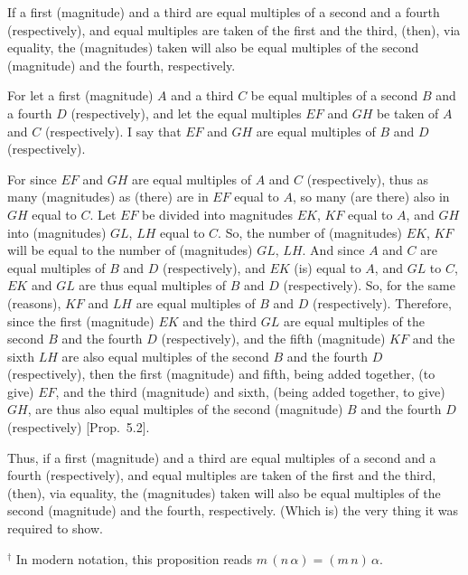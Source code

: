\begin{Parallel}{}{}
{If a first (magnitude) and a third are equal multiples
of a second and a fourth (respectively), and equal multiples are taken of the
first and the third, (then), via equality,  the 
(magnitudes) taken will also be equal multiples of the second (magnitude) and the fourth, respectively.

For let a first (magnitude) $A$ and a third $C$ be equal multiples of a
second $B$ and a fourth $D$ (respectively), and let the equal multiples
$EF$ and $GH$ be taken of $A$ and $C$ (respectively). I say that
$EF$ and $GH$ are equal multiples of $B$ and $D$ (respectively).

For since $EF$ and $GH$ are equal multiples of $A$ and $C$ (respectively), thus as many (magnitudes) as (there) are in $EF$ equal to $A$, so many (are there) also in
$GH$ equal to $C$. Let $EF$ be divided into magnitudes $EK$, $KF$ equal
to $A$, and $GH$ into (magnitudes) $GL$, $LH$ equal to $C$. So, the number of (magnitudes)
$EK$, $KF$ will be equal to the number of (magnitudes) $GL$, $LH$.
And since $A$ and $C$ are equal multiples of $B$ and $D$ (respectively), and $EK$ (is)
equal to $A$, and $GL$ to $C$,  $EK$ and $GL$ are thus equal multiples of $B$ and $D$
(respectively). So, for the same (reasons), $KF$ and $LH$ are equal multiples
of $B$ and $D$ (respectively). Therefore, since the first (magnitude) $EK$ and the
third $GL$ are equal multiples of the second $B$ and the fourth $D$ (respectively), and the fifth (magnitude) $KF$ and
the sixth $LH$ are  also  equal multiples of the second $B$ and the fourth $D$ (respectively),  then  the first (magnitude) and fifth, being added together,
(to give) $EF$, and the third (magnitude) and sixth, (being added together, to give) $GH$, are thus also equal multiples of the second (magnitude) $B$ and the fourth $D$ (respectively) [Prop.~5.2].

\epsfysize=2in
\centerline{}

Thus, if a first (magnitude) and a third are equal multiples
of a second and a fourth (respectively), and equal multiples are taken of the
first and the third, (then), via equality,  the 
(magnitudes) taken will also be equal multiples of the second (magnitude) and the fourth, respectively. (Which is) the very thing it was required to show.}
\end{Parallel}
{\footnotesize \noindent$^\dag$ In modern notation, this proposition reads
$m\,(n\,\alpha) = (m\,n)\,\alpha$.}


